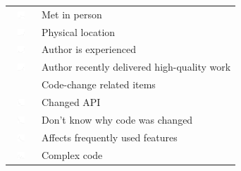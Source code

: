 \documentclass[12pt,oneside]{book}
\begin{document}
\begin{table}[t!]
\begin{tabular}{ll}
\vspace{-2pt}\includegraphics[height=10px, width=30px]{figures/sparkles/met-change-author-in-person.pdf} & Met in person\\
\vspace{-2pt}\includegraphics[height=10px, width=30px]{figures/sparkles/physical-location-of-the-change-author.pdf} & Physical location\\
\vspace{-2pt}\includegraphics[height=10px, width=30px]{figures/sparkles/change-author-is-experienced.pdf} & Author is experienced\\
\vspace{-2pt}\includegraphics[height=10px, width=30px]{figures/sparkles/recent-work-of-high-quality.pdf} & Author recently delivered high-quality work\\
\midrule
\vspace{-2pt}& Code-change related items \\
\midrule
\vspace{-2pt}\includegraphics[height=10px, width=30px]{figures/sparkles/change-modified-API.pdf} & Changed API\\
\vspace{-2pt}\includegraphics[height=10px, width=30px]{figures/sparkles/don-t-know-why-code-was-changed.pdf} & Don't know why code was changed\\
\vspace{-2pt}\includegraphics[height=10px, width=30px]{figures/sparkles/code-affects-frequently-used-features.pdf} & Affects frequently used features\\
\vspace{-2pt}\includegraphics[height=10px, width=30px]{figures/sparkles/complex-code-was-changed.pdf} & Complex code\\

\end{tabular}
\end{table}
\end{document}

